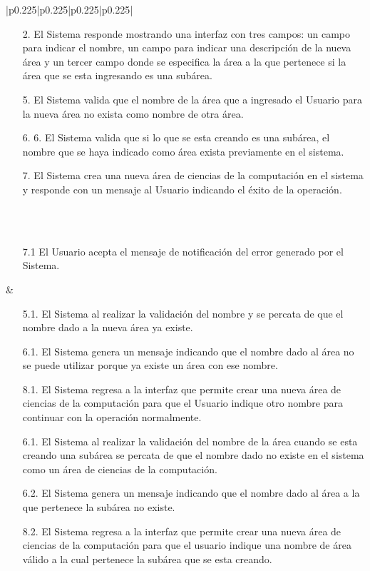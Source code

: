 \begin{center}
\begin{longtable}{|p{}|p{}|p{}|p{}|}
{
\begin{itemize}
\item[2.] El Sistema responde mostrando una interfaz con tres campos: un campo para indicar el nombre, un campo para indicar una descripción de la nueva área y un tercer campo donde se especifica la área a la que pertenece si la área que se esta ingresando es una subárea.
\item[5.]El Sistema valida que el nombre de la área que a ingresado el Usuario para la nueva área no exista como nombre de otra área.
\item[6. ]6. El Sistema valida que si lo que se esta creando es una subárea, el nombre que se haya indicado como área exista previamente en el sistema.
\item[7.] El Sistema crea una nueva área de ciencias de la computación en el sistema y responde con un mensaje al Usuario indicando el éxito de la operación. 
\end{itemize}
} \\
\hline
{}\\
\hline
{}
{
\begin{itemize}
\item[7.1] El Usuario acepta el mensaje de notificación del error generado por el Sistema.
\end{itemize}
} &
{
\begin{itemize}
\item[5.1.] El Sistema al realizar la validación del nombre y se percata de que el nombre dado a la nueva área ya existe.
\item[6.1.] El Sistema genera un mensaje indicando que el nombre dado al área no se puede utilizar porque ya existe un área con ese nombre.
\item[8.1.] El Sistema regresa a la interfaz que permite crear una nueva área de ciencias de la computación para que el Usuario indique otro nombre para continuar con la operación normalmente.
\item[6.1.] El Sistema al realizar la validación del nombre de la área cuando se esta creando una subárea se percata de que el nombre dado no existe en el sistema como un área de ciencias de la computación.
\item[6.2.  ]El Sistema genera un mensaje indicando que el nombre dado al área a la que pertenece la subárea no existe.
\item[8.2.] El Sistema regresa a la interfaz que permite crear una nueva área de ciencias de la computación para que el usuario indique una nombre de área válido a la cual pertenece la subárea que se esta creando.

\end{itemize}}
\end{longtable}
\end{center}
